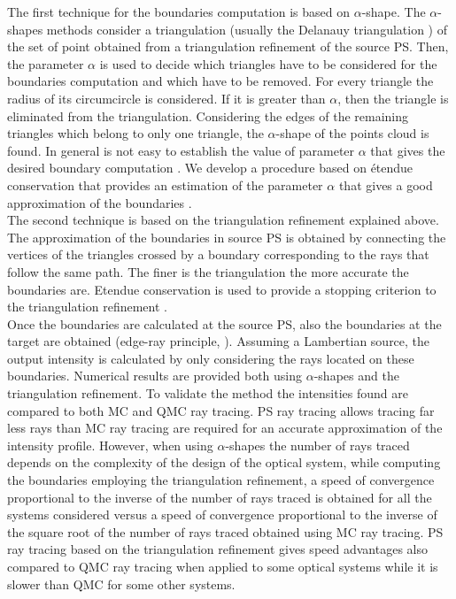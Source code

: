 The first technique for the boundaries computation is based on $\alpha$-shape. 
The $\alpha$-shapes methods consider a triangulation (usually the Delanauy triangulation \cite{marsden2003texts}) of the set of point obtained from a triangulation refinement of the source PS. Then, the parameter $\alpha$ is used to decide which triangles have to be considered for the boundaries computation and which have to be removed. For every triangle the radius of its circumcircle is considered. If it is greater than $\alpha$, then the triangle is eliminated from the triangulation. Considering the edges of the remaining triangles which belong to only one triangle, the $\alpha$-shape of the points cloud is found. In general is not easy to establish the value of parameter $\alpha$ that gives the desired boundary computation \cite{teichmann1998surface}. We develop a procedure based on \'{e}tendue conservation that provides an estimation of the parameter $\alpha$ that gives a good approximation of the boundaries \cite{filosa2015new}. \\ \indent The second technique is based on the triangulation refinement explained above. The approximation of the boundaries in source PS is obtained by connecting the vertices of the triangles crossed by a boundary corresponding to the rays that follow the same path. The finer is the triangulation the more accurate the boundaries are. Etendue conservation is used to provide a stopping criterion to the triangulation refinement \cite{filosa2016ray, filosa2017phase}. \\ \indent  
Once the boundaries are calculated at the source PS, also the boundaries at the target are obtained (edge-ray principle, \cite{Ries:2}). Assuming a Lambertian source, the output intensity is calculated by only considering the rays located on these boundaries. Numerical results are provided both using $\alpha$-shapes and the triangulation refinement. To validate the method the intensities found are compared to both MC and QMC ray tracing. PS ray tracing allows tracing far less rays than MC ray tracing are required for an accurate approximation of the intensity profile. However, when using $\alpha$-shapes the number of rays traced depends on the complexity of the design of the optical system, while computing the boundaries employing the triangulation refinement, a speed of convergence proportional to the inverse of the number of rays traced is obtained for all the systems considered versus a speed of convergence proportional to the inverse of the square root of the number of rays traced obtained using MC ray tracing. PS ray tracing based on the triangulation refinement gives speed advantages also compared to QMC ray tracing when applied to some optical systems while it is slower than QMC for some other systems.
